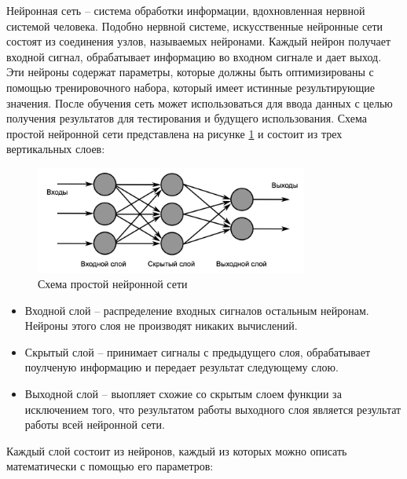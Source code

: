 Нейронная сеть -- система обработки информации, вдохновленная нервной системой человека\cite{Grossberg}. Подобно нервной системе, искусственные нейронные сети состоят из соединения узлов, называемых нейронами. Каждый нейрон получает входной сигнал, обрабатывает информацию во входном сигнале и дает выход. Эти нейроны содержат параметры, которые должны быть оптимизированы с помощью тренировочного набора, который имеет истинные результирующие значения. После обучения сеть может использоваться для ввода данных с целью получения результатов для тестирования и будущего использования. Схема простой нейронной сети представлена на рисунке \ref{anal:simple-nn} и состоит из трех вертикальных слоев:

\begin{figure}
	\centering
	\includegraphics[width=0.8\textwidth]{inc/img/simple-nn.png}
	\caption{Схема простой нейронной сети}
	\label{anal:simple-nn}
\end{figure}

\begin{itemize}
	\item Входной слой -- распределение входных сигналов остальным нейронам. Нейроны этого слоя не производят никаких вычислений.
	\item Скрытый слой -- принимает сигналы с предыдущего слоя, обрабатывает поулченую информацию и передает результат следующему слою.
	\item Выходной слой -- выопляет схожие со скрытым слоем функции за исключением того, что результатом работы выходного слоя является результат работы всей нейронной сети.
\end{itemize}

Каждый слой состоит из нейронов, каждый из которых можно описать математически с помощью его параметров:

